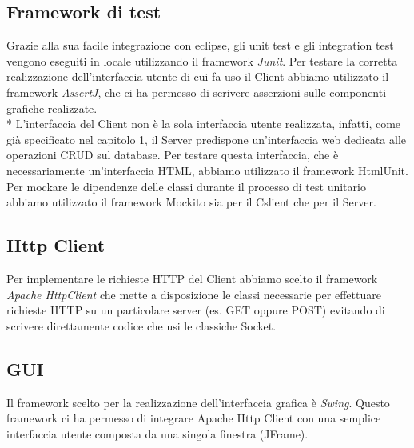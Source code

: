 \subsection{Framework di test}
Grazie alla sua facile integrazione con eclipse, gli unit test e gli integration test vengono eseguiti in locale utilizzando il framework \emph{Junit}. Per testare la corretta realizzazione dell'interfaccia utente di cui fa uso il Client abbiamo utilizzato il framework \emph{AssertJ}, che ci ha permesso di scrivere asserzioni sulle componenti grafiche realizzate.\\*
L'interfaccia del Client non \`e la sola interfaccia utente realizzata, infatti, come gi\`a specificato nel capitolo 1, il Server predispone un'interfaccia web dedicata alle operazioni CRUD sul database. Per testare questa interfaccia, che \`e necessariamente un'interfaccia HTML, abbiamo utilizzato il framework HtmlUnit. Per mockare le dipendenze delle classi durante il processo di test unitario abbiamo utilizzato il framework Mockito sia per il Cslient che per il Server.
\subsection{Http Client}
Per implementare le richieste HTTP del Client abbiamo scelto il framework \emph{Apache HttpClient} che mette a disposizione le classi necessarie per effettuare richieste HTTP su un particolare server (es. GET oppure POST) evitando di scrivere direttamente codice che usi le classiche Socket.
\subsection{GUI}
Il framework scelto per la realizzazione dell'interfaccia grafica \`e \emph{Swing}. Questo framework ci ha permesso di integrare Apache Http Client con una semplice interfaccia utente composta da una singola finestra (JFrame).